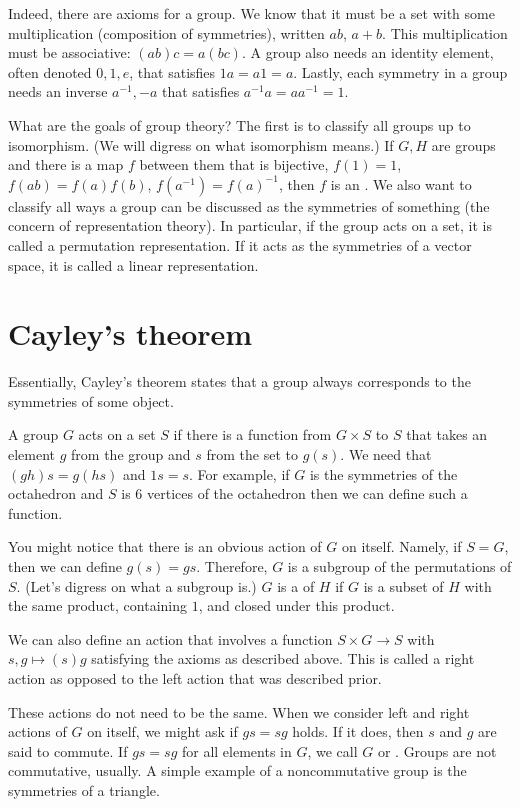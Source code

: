 \documentclass[11pt, twoside]{amsart}
\begin{document}
Indeed, there are axioms for a group. We know that it must be a set with some multiplication (composition of symmetries), written $ab$, $a+b$. This multiplication must be associative: $(ab)c = a(bc)$. A group also needs an identity element, often denoted $0,1,e$, that satisfies $1a = a1 = a$. Lastly, each symmetry in a group needs an inverse $a^{-1}, -a$ that satisfies $a^{-1}a = aa^{-1} = 1$.

What are the goals of group theory? The first is to classify all groups up to isomorphism. (We will digress on what isomorphism means.) If $G,H$ are groups and there is a map $f$ between them that is bijective, $f(1) = 1$, $f(ab) = f(a) f(b)$, $f(a^{-1}) = f(a)^{-1}$, then $f$ is an . We also want to classify all ways a group can be discussed as the symmetries of something (the concern of representation theory). In particular, if the group acts on a set, it is called a permutation representation. If it acts as the symmetries of a vector space, it is called a linear representation.

\section{Cayley's theorem}
Essentially, Cayley's theorem states that a group always corresponds to the symmetries of some object. 

A group $G$ acts on a set $S$ if there is a function from $G\times S$ to $S$ that takes an element $g$ from the group and $s$ from the set to $g(s)$. We need that $(gh)s = g(hs)$ and $1 s=s$. For example, if $G$ is the symmetries of the octahedron and $S$ is $6$ vertices of the octahedron then we can define such a function.

You might notice that there is an obvious action of $G$ on itself. Namely, if $S=G$, then we can define $g(s)=gs$. Therefore, $G$ is a subgroup of the permutations of $S$. (Let's digress on what a subgroup is.) $G$ is a  of $H$ if $G$ is a subset of $H$ with the same product, containing $1$, and closed under this product.

We can also define an action that involves a function $S\times G \longrightarrow S$ with $s,g \mapsto (s)g$ satisfying the axioms as described above. This is called a right action as opposed to the left action that was described prior. 

These actions do not need to be the same. When we consider left and right actions of $G$ on itself, we might ask if $gs=sg$ holds. If it does, then $s$ and $g$ are said to commute. If $gs=sg$ for all elements in $G$, we call $G$  or . Groups are not commutative, usually. A simple example of a noncommutative group is the symmetries of a triangle.
\end{document}
